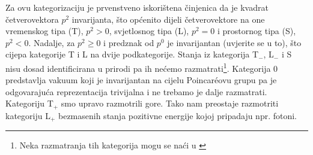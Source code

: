 Za ovu kategorizaciju je prvenstveno iskorištena činjenica da je
kvadrat četverovektora $p^2$ invarijanta, što općenito dijeli četverovektore
na one vremenskog tipa (T), $p^2>0$, svjetlosnog tipa (L), $p^2=0$ i prostornog tipa (S),
$p^2<0$.
Nadalje, za  $p^2 \ge 0$ i predznak od $p^0$ je invarijantan (uvjerite se u to),
što cijepa kategorije T i L na dvije podkategorije.
Stanja iz kategorija T$_-$, L$_-$ i S nisu dosad identificirana u prirodi pa ih
nećemo razmatrati\footnote{Neka razmatranja tih kategorija mogu se naći u
\cite{Baskal:2024}}.
Kategorija 0 predstavlja vakuum koji je invarijantan na cijelu Poincar\'{e}ovu
grupu pa je odgovarajuća reprezentacija trivijalna i ne trebamo je
dalje razmatrati.
Kategoriju T$_+$ smo upravo razmotrili gore.
Tako nam preostaje razmotriti kategoriju L$_+$ bezmasenih stanja pozitivne
energije kojoj pripadaju npr. fotoni.

